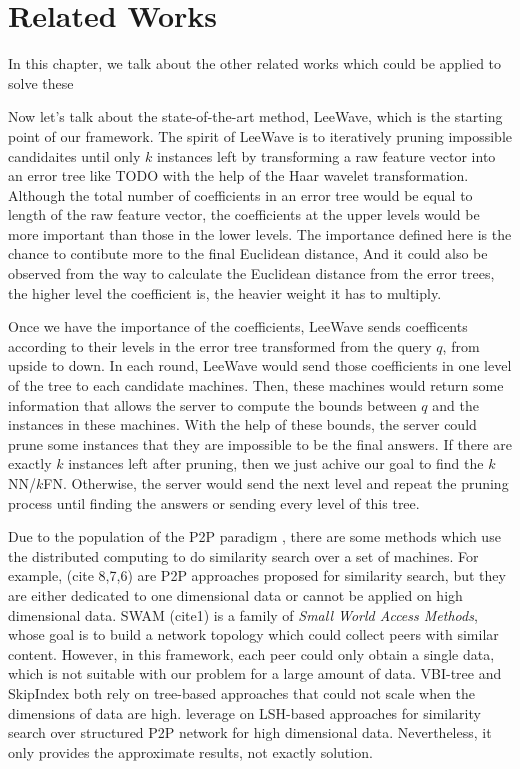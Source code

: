 \chapter{Related Works}
\label{c:related}

In this chapter, we talk about the other related works which could be applied to solve these 


Now let's talk about the state-of-the-art method, LeeWave, which is the starting point of our framework. The spirit of LeeWave is to iteratively pruning impossible candidaites until only $k$ instances left by transforming a raw feature vector into an error tree like TODO with the help of the Haar wavelet transformation. Although the total number of coefficients in an error tree would be equal to length of the raw feature vector, the coefficients at the upper levels would be more important than those in the lower levels.  The importance defined here is the chance to contibute more to the final Euclidean distance,  And it could also be observed from the way to calculate the Euclidean distance from the error trees, the higher level the coefficient is, the heavier weight it has to multiply.

Once we have the importance of the coefficients, LeeWave sends coefficents according to their levels in the error tree transformed from the query $q$, from upside to down. In each round, LeeWave would send those coefficients in one level of the tree to each candidate machines.  Then, these machines would return some information that allows the server to compute the bounds between $q$ and the instances in these machines.  With the help of these bounds, the server could prune some instances that they are impossible to be the final answers.  If there are exactly $k$ instances left after pruning, then we just achive our goal to find the $k$NN/$k$FN.  Otherwise, the server would send the next level and repeat the pruning process until finding the answers or sending every level of this tree.

Due to the population of the P2P paradigm \cite{SCAN,Chord}, there are some methods which use the distributed computing to do similarity search over a set of machines.  For example, (cite 8,7,6) are P2P approaches proposed for similarity search, but they are either dedicated to one dimensional data or cannot be applied on high dimensional data.  SWAM (cite1) is a family of \emph{Small World Access Methods}, whose goal is to build a network topology which could collect peers with similar content.  However, in this framework, each peer could only obtain a single data, which is not suitable with our problem for a large amount of data.  VBI-tree and SkipIndex both rely on tree-based approaches that could not scale when the dimensions of data are high. \cite{LSH} leverage on LSH-based approaches for similarity search over structured P2P network for high dimensional data.  Nevertheless, it only provides the approximate results, not exactly solution. 


%
%